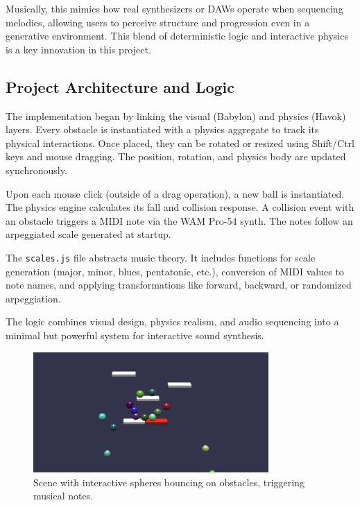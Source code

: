 \documentclass[a4paper,11pt]{article}
\begin{document}
Musically, this mimics how real synthesizers or DAWs operate when sequencing melodies, allowing users to perceive structure and progression even in a generative environment. This blend of deterministic logic and interactive physics is a key innovation in this project.
\subsection{Project Architecture and Logic}
The implementation began by linking the visual (Babylon) and physics (Havok) layers. Every obstacle is instantiated with a physics aggregate to track its physical interactions. Once placed, they can be rotated or resized using Shift/Ctrl keys and mouse dragging. The position, rotation, and physics body are updated synchronously.

Upon each mouse click (outside of a drag operation), a new ball is instantiated. The physics engine calculates its fall and collision response. A collision event with an obstacle triggers a MIDI note via the WAM Pro-54 synth. The notes follow an arpeggiated scale generated at startup.

The \texttt{scales.js} file abstracts music theory. It includes functions for scale generation (major, minor, blues, pentatonic, etc.), conversion of MIDI values to note names, and applying transformations like forward, backward, or randomized arpeggiation.

The logic combines visual design, physics realism, and audio sequencing into a minimal but powerful system for interactive sound synthesis.

\begin{figure}[h!]
    \centering
    \includegraphics[width=0.8\textwidth]{coloredSpheres.png}
    \caption{Scene with interactive spheres bouncing on obstacles, triggering musical notes.}
\end{figure}
\end{document}
